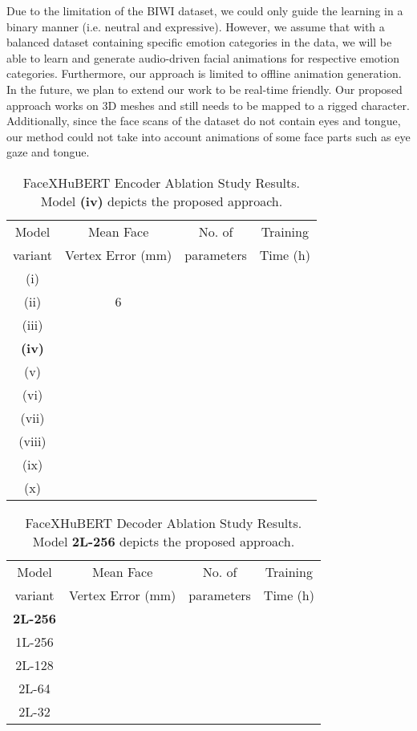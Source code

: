 \documentclass[10pt,twocolumn,letterpaper]{article}
\begin{document}
Due to the limitation of the BIWI dataset, we could only guide the learning in a binary manner (i.e. neutral and expressive). However, we assume that with a balanced dataset containing specific emotion categories in the data, we will be able to learn and generate audio-driven facial animations for respective emotion categories. Furthermore, our approach is limited to offline animation generation. In the future, we plan to extend our work to be real-time friendly. Our proposed approach works on 3D meshes and still needs to be mapped to a rigged character. Additionally, since the face scans of the dataset do not contain eyes and tongue, our method could not take into account animations of some face parts such as eye gaze and tongue. 
\begingroup
\setlength{\tabcolsep}{5pt} \renewcommand{\arraystretch}{0.6} \begin{table}[t]
  \centering
  \begin{tabular}{c c c c}
    \toprule
    Model & Mean Face & No. of  & Training\\
    variant & Vertex Error (mm) & parameters & Time (h)\\
    \midrule
    (i) &  &  & \\
    (ii) & 6 &  & \\
    (iii) &  &  & \\
    \textbf{(iv)} &  &  & \\
    (v) &  &  & \\
    (vi) &  &  & \\
    (vii) &  &  & \\
    (viii) &  &  & \\
    (ix) &  &  & \\
    (x) &  &  & \\
    \bottomrule
\end{tabular}
  \caption{FaceXHuBERT Encoder Ablation Study Results. Model \textbf{(iv)} depicts the proposed approach.}
  \label{tab:Hubert_ablation}
\end{table}
\endgroup

\begingroup
\setlength{\tabcolsep}{4pt} \renewcommand{\arraystretch}{0.6} \begin{table}[t]
  \centering
  \begin{tabular}{c c c c}
    \toprule
    Model & Mean Face  & No. of  & Training\\
    variant & Vertex Error (mm) & parameters & Time (h)\\
    \midrule
    \textbf{2L-256} &  &  & \\
    1L-256 &  &  & \\
    2L-128 &  &  & \\
    2L-64 &  &  & \\
    2L-32 &  &  & \\
    \bottomrule
\end{tabular}
  \caption{FaceXHuBERT Decoder Ablation Study Results. Model \textbf{2L-256} depicts the proposed approach.}
  \label{tab:GRU_ablation}
  \vspace{-1em}
\end{table}
\endgroup
\end{document}
